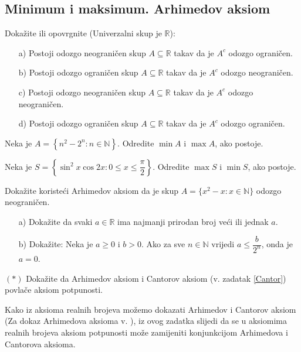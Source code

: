 \subsection*{Minimum i maksimum. Arhimedov aksiom}
\begin{exercise} Dokažite ili opovrgnite (Univerzalni skup je $\mathbb{R}$):
\begin{itemize}
\item[a)] Postoji odozgo neograničen skup $A\subseteq \mathbb{R}$ takav da je $A^c$ odozgo ograničen.
\item[b)] Postoji odozgo ograničen skup $A\subseteq \mathbb{R}$ takav da je $A^c$ odozgo neograničen.
\item[c)] Postoji odozgo neograničen skup $A\subseteq \mathbb{R}$ takav da je $A^c$ odozgo neograničen.
\item[d)] Postoji odozgo ograničen skup $A\subseteq \mathbb{R}$ takav da je $A^c$ odozgo ograničen.
\end{itemize}
\end{exercise}
\begin{exercise}
Neka je $A=\left\{n^2-2^n : n\in \mathbb{N}\right\}$. Odredite $\min{A}$ i $\max{A}$, ako postoje.
\end{exercise}
\begin{exercise}
Neka je $S=\left\{\sin^2{x}\cos{2x} : 0\leq x\leq \dfrac{\pi}{2}\right\}$. Odredite $\max{S}$ i $\min{S}$, ako postoje.
\end{exercise}
\begin{exercise}
Dokažite koristeći Arhimedov aksiom da je skup $A=\{x^2-x : x\in \mathbb{N}\}$ odozgo neograničen.
\end{exercise}
\begin{exercise} \textbf{}
\begin{itemize}
\item[a)] Dokažite da svaki $a\in \mathbb{R}$ ima najmanji prirodan broj veći ili jednak $a$.
\item[b)] Dokažite: Neka je $a\geq 0$ i $b>0$. Ako za sve $n\in \mathbb{N}$ vrijedi $a\leq \dfrac{b}{2^n}$, onda je $a=0$.
\end{itemize}
\end{exercise}
\begin{exercise} $(*)$
Dokažite da Arhimedov aksiom i Cantorov aksiom (v. zadatak \ref{Cantor}) povlače aksiom potpunosti.
\end{exercise}
\begin{remark}
Kako iz aksioma realnih brojeva možemo dokazati Arhimedov i Cantorov aksiom (Za dokaz Arhimedova aksioma v. \cite{3}), iz ovog zadatka slijedi da se u aksiomima realnih brojeva aksiom potpunosti može zamijeniti konjunkcijom Arhimedova i Cantorova aksioma.
\end{remark}
